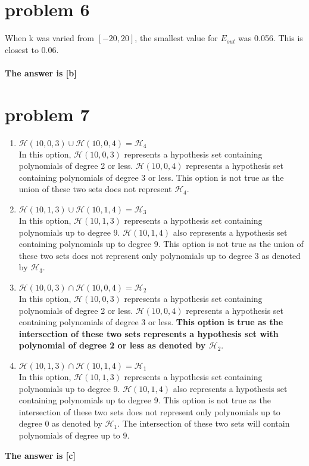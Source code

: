 \documentclass{article}
\begin{document}
\section*{problem 6}
When k was varied from $[-20, 20]$, the smallest value for $E_{out}$ was 0.056. This is closest to 0.06.\\\\
\textbf{The answer is [b]}

\section*{problem 7}
\begin{enumerate}[label=(\alph*)]
    \item $\mathcal{H}(10,0,3)\cup\mathcal{H}(10, 0, 4) = \mathcal{H}_4$\\
    In this option, $\mathcal{H}(10,0,3)$ represents a hypothesis set containing polynomials of degree 2 or less. $\mathcal{H}(10,0,4)$ represents a hypothesis set containing polynomials of degree 3 or less. This option is not true as the union of these two sets does not represent $\mathcal{H}_4$.
    \item $\mathcal{H}(10,1,3)\cup\mathcal{H}(10, 1, 4) = \mathcal{H}_3$\\
    In this option, $\mathcal{H}(10,1,3)$ represents a hypothesis set containing polynomials up to degree 9. $\mathcal{H}(10,1,4)$ also represents a hypothesis set containing polynomials up to degree 9. This option is not true as the union of these two sets does not represent only polynomials up to degree 3 as denoted by $\mathcal{H}_3$.
    \item $\mathcal{H}(10,0,3)\cap\mathcal{H}(10, 0, 4) = \mathcal{H}_2$\\
    In this option, $\mathcal{H}(10,0,3)$ represents a hypothesis set containing polynomials of degree 2 or less. $\mathcal{H}(10,0,4)$ represents a hypothesis set containing polynomials of degree 3 or less. \textbf{This option is true as the intersection of these two sets represents a hypothesis set with polynomial of degree 2 or less as denoted by $\mathcal{H}_2$}.
    \item $\mathcal{H}(10,1,3)\cap\mathcal{H}(10, 1, 4) = \mathcal{H}_1$\\
    In this option, $\mathcal{H}(10,1,3)$ represents a hypothesis set containing polynomials up to degree 9. $\mathcal{H}(10,1,4)$ also represents a hypothesis set containing polynomials up to degree 9. This option is not true as the intersection of these two sets does not represent only polynomials up to degree 0 as denoted by $\mathcal{H}_1$. The intersection of these two sets will contain polynomials of degree up to 9.
\end{enumerate}
\textbf{The answer is [c]}
\end{document}
